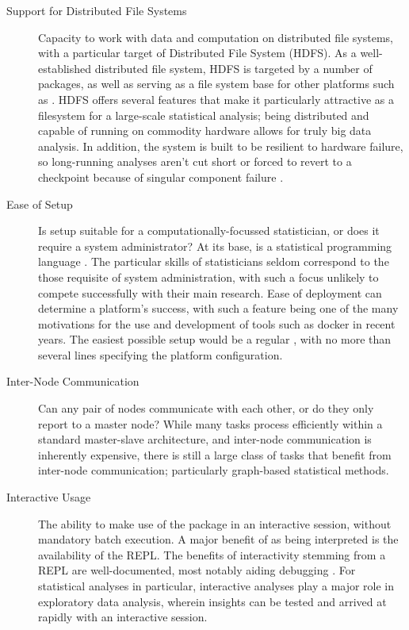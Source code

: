 \begin{description}
	\item[Support for Distributed File Systems]
		Capacity to work with data and computation on distributed file systems,
		with a particular target of 
		Distributed File System (HDFS).
		As a well-established distributed file system, HDFS is targeted by a number of \R{} packages, as well as serving as a file system base for other platforms such as  \cite{analytics:_rhadoop_wiki} \cite{deltarho:_rhipe}\cite{urbanek20}\cite{zaharia2016apache}.
		HDFS offers several features that make it particularly attractive as a filesystem for a large-scale statistical analysis; being distributed and capable of running on commodity hardware allows for truly big data analysis.
		In addition, the system is built to be resilient to hardware failure, so long-running analyses aren't cut short or forced to revert to a checkpoint because of singular component failure \cite{shvachko2010hadoop}.
	\item[Ease of Setup]
		Is setup suitable for a computationally-focussed statistician, or does
		it require a system administrator?
		At its base, \R{} is a statistical programming language \cite{rcore2020intro}.
		The particular skills of statisticians seldom correspond to the those requisite of system administration, with such a focus unlikely to compete successfully with their main research.
		Ease of deployment can determine a platform's success, with such a feature being one of the many motivations for the use and development of tools such as docker in recent years.
		The easiest possible setup would be a regular , with no more than several lines specifying the platform configuration.
	\item[Inter-Node Communication]
		Can any pair of nodes communicate with each other, or do they only
		report to a master node?
		While many tasks process efficiently within a standard master-slave architecture, and inter-node communication is inherently expensive, there is still a large class of tasks that benefit from inter-node communication\cite{walker1996mpi}; particularly graph-based statistical methods.
	\item[Interactive Usage]
		The ability to make use of the package in an interactive \R{} session,
		without mandatory batch execution.
		A major benefit of \R{} as being interpreted is the availability of the REPL.
		The benefits of interactivity stemming from a REPL are well-documented, most notably aiding debugging \cite{mccarthy1978history}.
		For statistical analyses in particular, interactive analyses play a major role in exploratory data analysis, wherein insights can be tested and arrived at rapidly with an interactive session.

\end{description}
